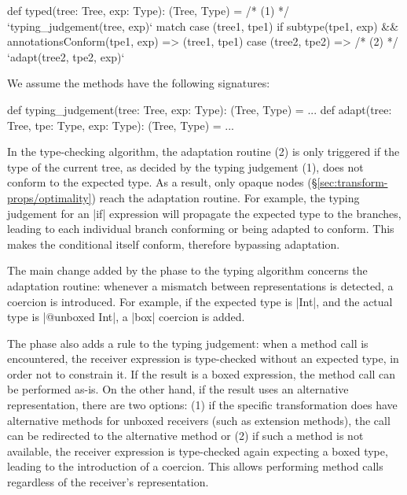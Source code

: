 \begin{lstlisting-nobreak}
 def typed(tree: Tree, exp: Type): (Tree, Type) =
   /* (1) */ `typing_judgement(tree, exp)` match {
     case (tree1, tpe1) if
           subtype(tpe1, exp) &&
           annotationsConform(tpe1, exp) =>
       (tree1, tpe1)
     case (tree2, tpe2) =>
       /* (2) */ `adapt(tree2, tpe2, exp)`
   }
\end{lstlisting-nobreak}

We assume the methods have the following signatures:

\begin{lstlisting-nobreak}
 def typing_judgement(tree: Tree, exp: Type):
                                         (Tree, Type) = ...
 def adapt(tree: Tree, tpe: Type, exp: Type):
                                         (Tree, Type) = ...
\end{lstlisting-nobreak}

In the type-checking algorithm, the adaptation routine (2) is only triggered if the type of the current tree, as decided by the typing judgement (1), does not conform to the expected type. As a result, only opaque nodes (\S\ref{sec:transform-props/optimality}) reach the adaptation routine. For example, the typing judgement for an |if| expression will propagate the expected type to the branches, leading to each individual branch conforming or being adapted to conform. This makes the conditional itself conform, therefore bypassing adaptation.

The main change added by the \coerce{} phase to the typing algorithm concerns the adaptation routine: whenever a mismatch between representations is detected, a coercion is introduced. For example, if the expected type is |Int|, and the actual type is |@unboxed Int|, a |box| coercion is added.

The \coerce{} phase also adds a rule to the typing judgement: when a method call is encountered, the receiver expression is type-checked without an expected type, in order not to constrain it. If the result is a boxed expression, the method call can be performed as-is. On the other hand, if the result uses an alternative representation, there are two options: (1) if the specific transformation does have alternative methods for unboxed receivers (such as extension methods), the call can be redirected to the alternative method or (2) if such a method is not available, the receiver expression is type-checked again expecting a boxed type, leading to the introduction of a coercion. This allows performing method calls regardless of the receiver's representation.

